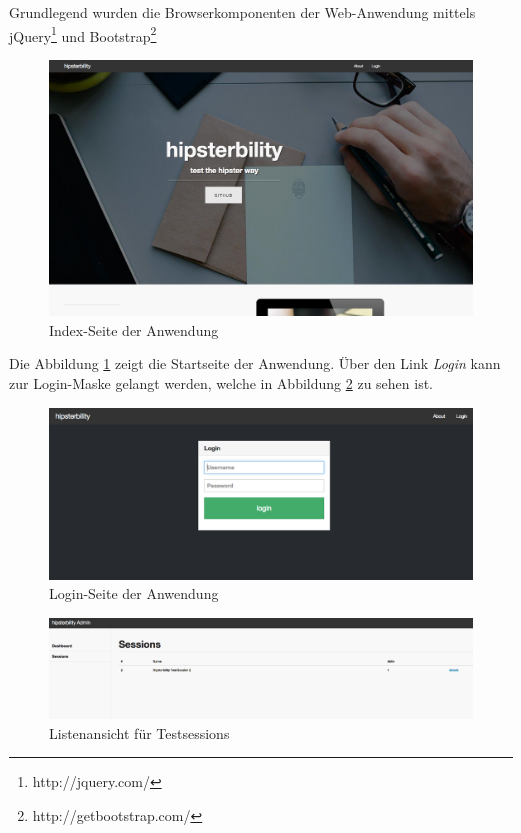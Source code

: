 Grundlegend wurden die Browserkomponenten der Web-Anwendung mittels jQuery\footnote{http://jquery.com/} und Bootstrap\footnote{http://getbootstrap.com/}

\begin{figure}[h!]
	\centering
		\includegraphics[width=\linewidth,keepaspectratio]{img/index-page.png}
	\caption{Index-Seite der Anwendung}
	\label{fig: index-page}
\end{figure}

Die Abbildung \ref{fig: index-page} zeigt die Startseite der Anwendung. Über den Link \emph{Login} kann zur Login-Maske gelangt werden, welche in Abbildung \ref{fig: login-page} zu sehen ist. 

\begin{figure}[h!]
	\centering
		\includegraphics[width=\linewidth,keepaspectratio]{img/login-page.png}
	\caption{Login-Seite der Anwendung}
	\label{fig: login-page}
\end{figure}

\begin{figure}[h!]
	\centering
		\includegraphics[width=\linewidth,keepaspectratio]{img/sessions-page.png}
	\caption{Listenansicht für Testsessions}
	\label{fig: sessions-page}
\end{figure}


